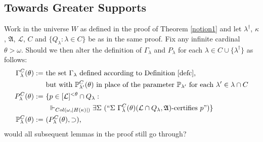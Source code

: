 \documentclass[12pt, twoside]{memoir}
\numberwithin{equation}{section}
\theoremstyle{definition}
\theoremstyle{remark}
\theoremstyle{definition}
\theoremstyle{definition}
\theoremstyle{definition}
\theoremstyle{remark}
\begin{document}
\subsection{Towards Greater Supports}

Work in the universe $W$ as defined in the proof of Theorem \ref{notion1} and let $\lambda^{\dagger}$, $\kappa$, $\mathfrak{A}$, $\mathcal{L}$, $C$ and $\{Q_{\lambda} : \lambda \in C\}$ be as in the same proof. Fix any infinite cardinal $\theta > \omega$. Should we then alter the definition of $\Gamma_{\lambda}$ and $P_{\lambda}$ for each $\lambda \in C \cup \{\lambda^{\dagger}\}$ as follows:
\begin{align*}
    \Gamma_{\lambda}^C(\theta) := \ & \text{the set } \Gamma_{\lambda} \text{ defined according to Definition \ref{defc},} \\
    & \text{but with } \mathbb{P}^C_{\lambda'}(\theta) \text{ in place of the parameter } \mathbb{P}_{\lambda'} \text{ for each } \lambda' \in \lambda \cap C \\
    P_{\lambda}^C(\theta) := \ & \{p \in [\mathcal{L}]^{< \theta} \cap Q_{\lambda} : \\
    & \ \Vdash_{Col(\omega, |H(\kappa)|)} \exists \Sigma \ (``\Sigma \ \Gamma^C_{\lambda}(\theta) (\mathcal{L} \cap Q_{\lambda}, \mathfrak{A}) \text{-certifies } p")\} \\
    \mathbb{P}^C_{\lambda}(\theta) := \ & (P^C_{\lambda}(\theta), \supset) \text{,}
\end{align*}
would all subsequent lemmas in the proof still go through?
\end{document}
